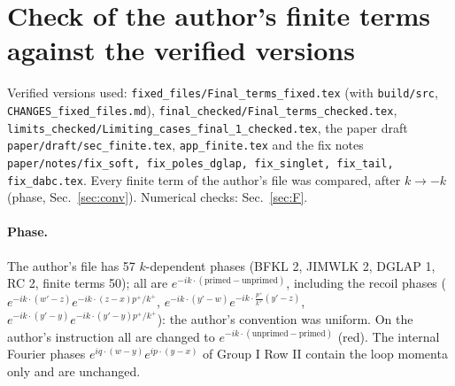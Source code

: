 \documentclass[9pt]{article}
\numberwithin{equation}{section}
\begin{document}
\section{Check of the author's finite terms against the verified versions}\label{sec:A}
\sloppy
\noindent Verified versions used: \texttt{fixed\_files/Final\_terms\_fixed.tex} (with \texttt{build/src}, \texttt{CHANGES\_fixed\_files.md}), \texttt{final\_checked/Final\_terms\_checked.tex}, \texttt{limits\_checked/Limiting\_cases\_final\_1\_checked.tex}, the paper draft \texttt{paper/draft/sec\_finite.tex}, \texttt{app\_finite.tex} and the fix notes \texttt{paper/notes/fix\_soft, fix\_poles\_dglap, fix\_singlet, fix\_tail, fix\_dabc.tex}. Every finite term of the author's file was compared, after $k\to-k$ (phase, Sec.~\ref{sec:conv}). Numerical checks: Sec.~\ref{sec:F}.

\paragraph{Phase.} The author's file has 57 $k$-dependent phases (BFKL 2, JIMWLK 2, DGLAP 1, RC 2, finite terms 50); all are $e^{-ik\cdot(\text{primed}-\text{unprimed})}$, including the recoil phases ($e^{-ik\cdot(w'-z)}e^{-ik\cdot(z-x)p^{+}/k^{+}}$, $e^{-ik\cdot(y'-w)}e^{-ik\cdot\frac{p^{+}}{k^{+}}(y'-z)}$, $e^{-ik\cdot(y'-y)}e^{-ik\cdot(y'-y)p^{+}/k^{+}}$): the author's convention was uniform. On the author's instruction all are changed to $e^{-ik\cdot(\text{unprimed}-\text{primed})}$ (red). The internal Fourier phases $e^{iq\cdot(w-y)}e^{ip\cdot(y-x)}$ of Group I Row II contain the loop momenta only and are unchanged.
\end{document}
